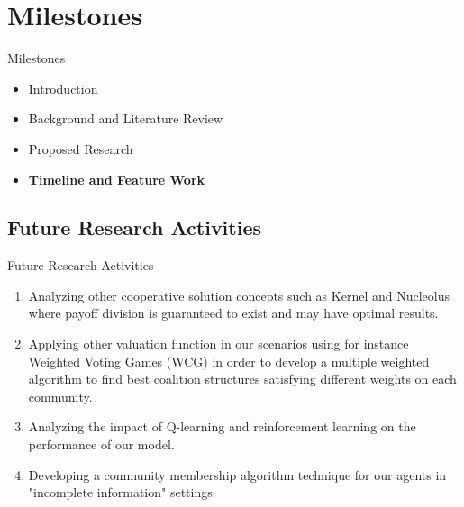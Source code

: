 \documentclass{beamer}
\begin{document}
\section{Milestones}
\begin{frame}{Milestones}
    \begin{itemize}
     	\itemsep=.5cm
    	\item Introduction
    	\item Background and Literature Review
    	\item Proposed Research
    	\item {\bf Timeline and Feature Work}
    \end{itemize}
\end{frame}

\subsection{Future Research Activities}
\begin{frame}{Future Research Activities}
    \begin{enumerate}
        \item Analyzing other cooperative solution concepts such as Kernel
        and Nucleolus where payoff division is guaranteed to exist and may
        have optimal results.

        \item Applying other valuation function in our scenarios using for
        instance Weighted Voting Games (WCG) in order to develop a
        multiple weighted algorithm to find best coalition structures
        satisfying different weights on each community.

        \item Analyzing the impact of Q-learning and reinforcement
        learning on the performance of our model.

        \item Developing a community membership algorithm technique for
        our agents in "incomplete information" settings.

    \end{enumerate}
\end{frame}
\end{document}
